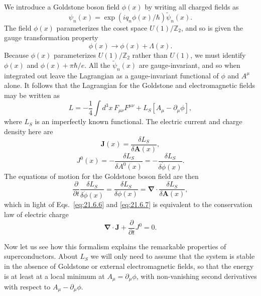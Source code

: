 We introduce a Goldstone boson field $\phi(x)$ by writing all charged fields as
\begin{equation}
\psi_n(x)=\exp\!\left(iq_n\phi(x)/\hbar\right)\widetilde\psi_n(x).
\tag{21.6.3}\label{eq:21.6.3}
\end{equation}
The field $\phi(x)$ parameterizes the coset space $U(1)/\mathbb Z_2$, and so is given the gauge transformation property
\begin{equation}
\phi(x)\longrightarrow\phi(x)+\Lambda(x).
\tag{21.6.4}\label{eq:21.6.4}
\end{equation}
Because $\phi(x)$ parameterizes $U(1)/\mathbb Z_2$ rather than $U(1)$, we must identify $\phi(x)$ and $\phi(x)+\pi\hbar/e$. All the $\widetilde\psi_n(x)$ are gauge-invariant, and so when integrated out leave the Lagrangian as a gauge-invariant functional of $\phi$ and $A^\mu$ alone. It follows that the Lagrangian for the Goldstone and electromagnetic fields may be written as
\begin{equation}
L=-\frac14\int d^3x\,F_{\mu\nu}F^{\mu\nu}
+L_S[A_\mu-\partial_\mu\phi],
\tag{21.6.5}\label{eq:21.6.5}
\end{equation}
where $L_S$ is an imperfectly known functional. The electric current and charge density here are
\begin{equation}
\mathbf J(x)=\frac{\delta L_S}{\delta\mathbf A(x)},
\tag{21.6.6}\label{eq:21.6.6}
\end{equation}
\begin{equation}
J^0(x)=-\frac{\delta L_S}{\delta A^0(x)}
=-\frac{\delta L_S}{\delta\dot\phi(x)}.
\tag{21.6.7}\label{eq:21.6.7}
\end{equation}
The equations of motion for the Goldstone boson field are then
\begin{equation}
\frac{\partial}{\partial t}
\frac{\delta L_S}{\delta\dot\phi(x)}
=\frac{\delta L_S}{\delta\phi(x)}
=\boldsymbol\nabla\cdot
\frac{\delta L_S}{\delta\mathbf A(x)},
\tag{21.6.8}\label{eq:21.6.8}
\end{equation}
which in light of Eqs.~\eqref{eq:21.6.6} and \eqref{eq:21.6.7} is equivalent to the conservation law of electric charge
\begin{equation}
\boldsymbol\nabla\cdot\mathbf J
+\frac{\partial}{\partial t}J^0=0.
\tag{21.6.9}\label{eq:21.6.9}
\end{equation}

Now let us see how this formalism explains the remarkable properties of superconductors. About $L_S$ we will only need to assume that the system is stable in the absence of Goldstone or external electromagnetic fields, so that the energy is at least at a local minimum at $A_\mu=\partial_\mu\phi$, with non-vanishing second derivatives with respect to $A_\mu-\partial_\mu\phi$.

